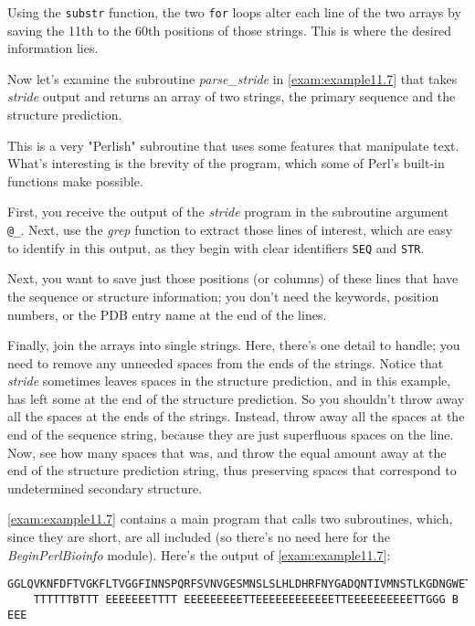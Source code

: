 Using the \verb|substr| function, the two \verb|for| loops alter each line of the two arrays by saving the 11th to the 60th positions of those strings. This is where the desired information lies.

Now let's examine the subroutine \textit{parse\_stride} in \autoref{exam:example11.7} that takes \textit{stride} output and returns an array of two strings, the primary sequence and the structure prediction.

This is a very "Perlish" subroutine that uses some features that manipulate text. What's interesting is the brevity of the program, which some of Perl's built-in functions make possible.

First, you receive the output of the \textit{stride} program in the subroutine argument \verb|@_|. Next, use the \textit{grep} function to extract those lines of interest, which are easy to identify in this output, as they begin with clear identifiers \verb|SEQ| and \verb|STR|.  

Next, you want to save just those positions (or columns) of these lines that have the sequence or structure information; you don't need the keywords, position numbers, or the PDB entry name at the end of the lines.

Finally, join the arrays into single strings. Here, there's one detail to handle; you need to remove any unneeded spaces from the ends of the strings. Notice that \textit{stride} sometimes leaves spaces in the structure prediction, and in this example, has left some at the end of the structure prediction. So you shouldn't throw away all the spaces at the ends of the strings. Instead, throw away all the spaces at the end of the sequence string, because they are just superfluous spaces on the line. Now, see how many spaces that was, and throw the equal amount away at the end of the structure prediction string, thus preserving spaces that correspond to undetermined secondary structure.

\autoref{exam:example11.7} contains a main program that calls two subroutines, which, since they are short, are all included (so there's no need here for the \textit{BeginPerlBioinfo} module). Here's the output of \autoref{exam:example11.7}: 

\begin{lstlisting}
GGLQVKNFDFTVGKFLTVGGFINNSPQRFSVNVGESMNSLSLHLDHRFNYGADQNTIVMNSTLKGDNGWETEQRSTNFTL
    TTTTTTBTTT EEEEEEETTTT EEEEEEEEETTEEEEEEEEEEEETTEEEEEEEEEETTGGG B   EEE     
\end{lstlisting}

